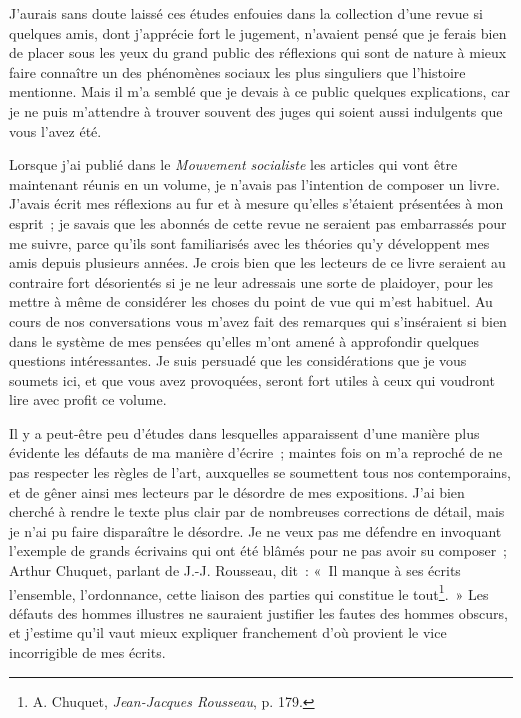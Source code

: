 \documentclass[french,twoside]{book} %
\begin{document}
\noindent J’aurais sans doute laissé ces études enfouies dans la collection d’une revue si quelques amis, dont j’apprécie fort le jugement, n’avaient pensé que je ferais bien de placer sous les yeux du grand public des réflexions qui sont de nature à mieux faire connaître un des phénomènes sociaux les plus singuliers que l’histoire mentionne. Mais il m’a semblé que je devais à ce public quelques explications, car je ne puis m’attendre à trouver souvent des juges qui soient aussi indulgents que vous l’avez été.\par
Lorsque j’ai publié dans le \emph{Mouvement socialiste} les articles qui vont être maintenant réunis en un volume, je n’avais pas l’intention de composer un livre. J’avais écrit mes réflexions au fur et à mesure qu’elles s’étaient présentées à mon esprit ; je savais que les abonnés de cette revue ne seraient pas embarrassés pour me suivre, parce qu’ils sont familiarisés avec les théories qu’y développent mes amis depuis plusieurs années. Je crois bien que les lecteurs de ce livre seraient au contraire fort désorientés si je ne leur adressais une sorte de plaidoyer,  pour les mettre à même de considérer les choses du point de vue qui m’est habituel. Au cours de nos conversations vous m’avez fait des remarques qui s’inséraient si bien dans le système de mes pensées qu’elles m’ont amené à approfondir quelques questions intéressantes. Je suis persuadé que les considérations que je vous soumets ici, et que vous avez provoquées, seront fort utiles à ceux qui voudront lire avec profit ce volume.\par
Il y a peut-être peu d’études dans lesquelles apparaissent d’une manière plus évidente les défauts de ma manière d’écrire ; maintes fois on m’a reproché de ne pas respecter les règles de l’art, auxquelles se soumettent tous nos contemporains, et de gêner ainsi mes lecteurs par le désordre de mes expositions. J’ai bien cherché à rendre le texte plus clair par de nombreuses corrections de détail, mais je n’ai pu faire disparaître le désordre. Je ne veux pas me défendre en invoquant l’exemple de grands écrivains qui ont été blâmés pour ne pas avoir su composer ; Arthur Chuquet, parlant de J.-J. Rousseau, dit : « Il manque à ses écrits l’ensemble, l’ordonnance, cette liaison des parties qui constitue le tout\footnote{ \noindent A. Chuquet, \emph{Jean-Jacques Rousseau}, p. 179.
 }. » Les défauts des hommes illustres ne sauraient justifier les fautes des hommes obscurs, et j’estime qu’il vaut mieux expliquer franchement d’où provient le vice incorrigible de mes écrits.\par
\end{document}
